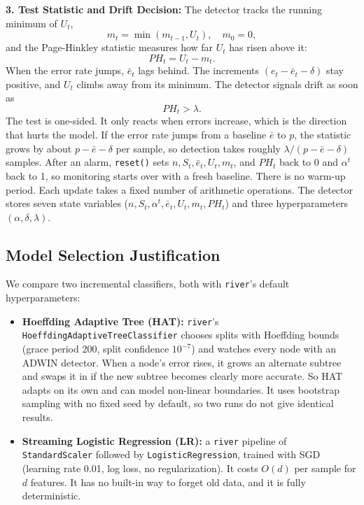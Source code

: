 \documentclass[conference]{IEEEtran}
\begin{document}
\smallskip
\noindent\textbf{3. Test Statistic and Drift Decision:}
The detector tracks the running minimum of $U_t$,
\begin{equation}
m_t = \min(m_{t-1}, U_t), \quad m_0 = 0,
\label{eq:min}
\end{equation}
and the Page-Hinkley statistic measures how far $U_t$ has risen above it:
\begin{equation}
PH_t = U_t - m_t .
\label{eq:ph_stat}
\end{equation}
When the error rate jumps, $\bar{e}_t$ lags behind.
The increments $(e_t - \bar{e}_t - \delta)$ stay positive, and $U_t$ climbs away from its minimum.
The detector signals drift as soon as
\begin{equation}
PH_t > \lambda .
\label{eq:threshold}
\end{equation}
The test is one-sided. It only reacts when errors increase, which is the direction that hurts the model.
If the error rate jumps from a baseline $\bar{e}$ to $p$, the statistic grows by about $p - \bar{e} - \delta$ per sample, so detection takes roughly $\lambda / (p - \bar{e} - \delta)$ samples.
After an alarm, \texttt{reset()} sets $n, S_t, \bar{e}_t, U_t, m_t$, and $PH_t$ back to 0 and $\alpha^t$ back to 1, so monitoring starts over with a fresh baseline.
There is no warm-up period.
Each update takes a fixed number of arithmetic operations.
The detector stores seven state variables ($n, S_t, \alpha^t, \bar{e}_t, U_t, m_t, PH_t$) and three hyperparameters $(\alpha, \delta, \lambda)$.

\subsection{Model Selection Justification}
We compare two incremental classifiers, both with \texttt{river}'s default hyperparameters:
\begin{itemize}
    \item \textbf{Hoeffding Adaptive Tree (HAT):} \texttt{river}'s \texttt{Hoeffding\-Adaptive\-Tree\-Classifier} chooses splits with Hoeffding bounds (grace period 200, split confidence $10^{-7}$) and watches every node with an ADWIN detector. When a node's error rises, it grows an alternate subtree and swaps it in if the new subtree becomes clearly more accurate. So HAT adapts on its own and can model non-linear boundaries. It uses bootstrap sampling with no fixed seed by default, so two runs do not give identical results.
    \item \textbf{Streaming Logistic Regression (LR):} a \texttt{river} pipeline of \texttt{StandardScaler} followed by \texttt{LogisticRegression}, trained with SGD (learning rate 0.01, log loss, no regularization). It costs $O(d)$ per sample for $d$ features. It has no built-in way to forget old data, and it is fully deterministic.
\end{itemize}
\end{document}
